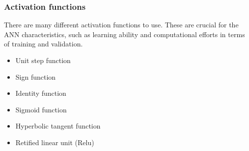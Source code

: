 \subsubsection{Activation functions}
There are many different activation functions to use. These are crucial for the ANN characteristics, such as learning ability and computational efforts in terms of training and validation.

\begin{itemize}
    \item Unit step function
    \item Sign function
    \item Identity function
    \item Sigmoid function
    \item Hyperbolic tangent function
    \item Retified linear unit (Relu) 
\end{itemize}

